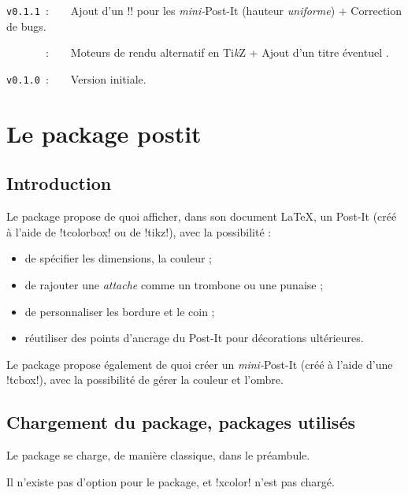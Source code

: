\documentclass[french,a4paper,11pt]{article}
\providecommand\tikzlogo{Ti\textit{k}Z}
\let\TikZ\tikzlogo
\begin{document}
\verb|v0.1.1|~:~~~~Ajout d'un \motcletex!\vphantom! pour les \textit{mini-}Post-It (hauteur \textit{uniforme}) + Correction de bugs.

\verb|      |~:~~~~Moteurs de rendu alternatif en \TikZ{} + Ajout d'un titre éventuel .

\verb|v0.1.0|~:~~~~Version initiale.

\newpage

\section{Le package postit}

\subsection{Introduction}

\begin{noteblock}
Le package propose de quoi afficher, dans son document \LaTeX, un Post-It (créé à l'aide de \packagetex!tcolorbox! ou de \packagetex!tikz!), avec la possibilité :

\begin{itemize}
	\item de spécifier les dimensions, la couleur ;
	\item de rajouter une \textit{attache} comme un trombone ou une punaise ;
	\item de personnaliser les bordure et le coin ;
	\item réutiliser des points d'ancrage du Post-It pour décorations ultérieures.
\end{itemize}

Le package propose également de quoi créer un \textit{mini-}Post-It (créé à l'aide d'une \motcletex!tcbox!), avec la possibilité de gérer la couleur et l'ombre.
\end{noteblock}

\subsection{Chargement du package, packages utilisés}

\begin{importantblock}
Le package se charge, de manière classique, dans le préambule.

Il n'existe pas d'option pour le package, et \packagetex!xcolor! n'est pas chargé.
\end{importantblock}

\end{document}
